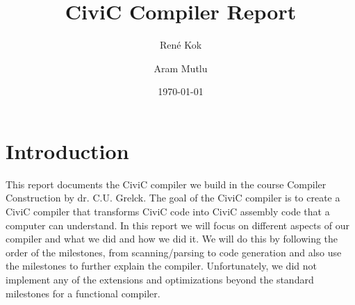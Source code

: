 \documentclass[hidelinks]{uva-inf-article}
\title{CiviC Compiler Report}
\author{René Kok}
\author{Aram Mutlu}
\date{\today}
\begin{document}
\maketitle
\newpage


\tableofcontents
\begin{abstract}
\end{abstract}
\newpage

\section{Introduction}
\par This report documents the CiviC compiler we build in 
the course Compiler Construction by dr. C.U. Grelck. The goal of the CiviC compiler 
is to create a CiviC compiler that transforms CiviC code into CiviC assembly code 
that a computer can understand. In this report we will focus on different aspects 
of our compiler and what we did and how we did it. We will do this by following the order of the milestones,
from scanning/parsing to code generation and also use the milestones to further 
explain the compiler. Unfortunately, we did not implement any of the extensions and optimizations beyond the standard 
milestones for a functional compiler.

\newpage
\end{document}
